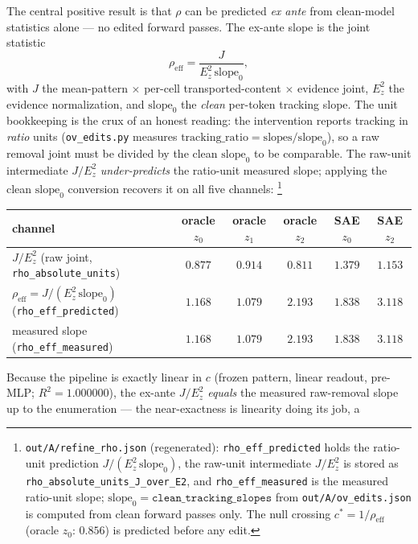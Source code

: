 \documentclass{article}
\begin{document}
The central positive result is that $\rho$ can be predicted \emph{ex ante} from
clean-model statistics alone --- no edited forward passes. The ex-ante slope is the
joint statistic
\begin{equation}\label{eq:rhoeff}
\rho_{\mathrm{eff}}=\frac{J}{E_z^2\,\mathrm{slope}_0},
\end{equation}
with $J$ the mean-pattern $\times$ per-cell transported-content $\times$ evidence
joint, $E_z^2$ the evidence normalization, and $\mathrm{slope}_0$ the \emph{clean}
per-token tracking slope. The unit bookkeeping is the crux of an honest reading: the
intervention reports tracking in \emph{ratio} units (\texttt{ov\_edits.py} measures
$\mathrm{tracking\_ratio}=\mathrm{slopes}/\mathrm{slope}_0$), so a raw removal joint
must be divided by the clean $\mathrm{slope}_0$ to be comparable. The raw-unit
intermediate $J/E_z^2$ \emph{under-predicts} the ratio-unit measured slope; applying
the clean $\mathrm{slope}_0$ conversion recovers it on all five channels:%
\footnote{\texttt{out/A/refine\_rho.json} (regenerated): \texttt{rho\_eff\_predicted}
holds the ratio-unit prediction $J/(E_z^2\,\mathrm{slope}_0)$, the raw-unit intermediate
$J/E_z^2$ is stored as \texttt{rho\_absolute\_units\_J\_over\_E2}, and
\texttt{rho\_eff\_measured} is the measured ratio-unit slope;
$\mathrm{slope}_0=\texttt{clean\_tracking\_slopes}$ from \texttt{out/A/ov\_edits.json} is
computed from clean forward passes only. The null crossing
$c^\ast=1/\rho_{\mathrm{eff}}$ (oracle $z_0$: $0.856$) is predicted before any edit.}
\begin{center}
\begin{tabular}{lccccc}
\toprule
channel & oracle $z_0$ & oracle $z_1$ & oracle $z_2$ & SAE $z_0$ & SAE $z_2$\\
\midrule
$J/E_z^2$ (raw joint, \texttt{rho\_absolute\_units}) & $0.877$ & $0.914$ & $0.811$ & $1.379$ & $1.153$\\
$\rho_{\mathrm{eff}}=J/(E_z^2\,\mathrm{slope}_0)$ (\texttt{rho\_eff\_predicted}) & $1.168$ & $1.079$ & $2.193$ & $1.838$ & $3.118$\\
measured slope (\texttt{rho\_eff\_measured}) & $1.168$ & $1.079$ & $2.193$ & $1.838$ & $3.118$\\
\bottomrule
\end{tabular}
\end{center}
Because the pipeline is exactly linear in $c$ (frozen pattern, linear readout,
pre-MLP; $R^2=1.000000$), the ex-ante $J/E_z^2$ \emph{equals} the measured raw-removal
slope up to the enumeration --- the near-exactness is linearity doing its job, a
\end{document}
